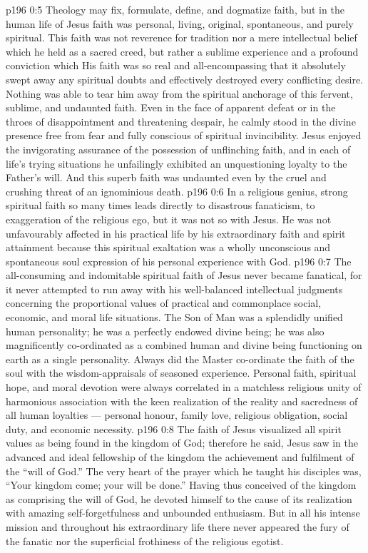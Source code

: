 \vs p196 0:5 Theology may fix, formulate, define, and dogmatize faith, but in the human life of Jesus faith was personal, living, original, spontaneous, and purely spiritual. This faith was not reverence for tradition nor a mere intellectual belief which he held as a sacred creed, but rather a sublime experience and a profound conviction which  His faith was so real and all\hyp{}encompassing that it absolutely swept away any spiritual doubts and effectively destroyed every conflicting desire. Nothing was able to tear him away from the spiritual anchorage of this fervent, sublime, and undaunted faith. Even in the face of apparent defeat or in the throes of disappointment and threatening despair, he calmly stood in the divine presence free from fear and fully conscious of spiritual invincibility. Jesus enjoyed the invigorating assurance of the possession of unflinching faith, and in each of life’s trying situations he unfailingly exhibited an unquestioning loyalty to the Father’s will. And this superb faith was undaunted even by the cruel and crushing threat of an ignominious death.
\vs p196 0:6 In a religious genius, strong spiritual faith so many times leads directly to disastrous fanaticism, to exaggeration of the religious ego, but it was not so with Jesus. He was not unfavourably affected in his practical life by his extraordinary faith and spirit attainment because this spiritual exaltation was a wholly unconscious and spontaneous soul expression of his personal experience with God.
\vs p196 0:7 The all\hyp{}consuming and indomitable spiritual faith of Jesus never became fanatical, for it never attempted to run away with his well\hyp{}balanced intellectual judgments concerning the proportional values of practical and commonplace social, economic, and moral life situations. The Son of Man was a splendidly unified human personality; he was a perfectly endowed divine being; he was also magnificently co\hyp{}ordinated as a combined human and divine being functioning on earth as a single personality. Always did the Master co\hyp{}ordinate the faith of the soul with the wisdom\hyp{}appraisals of seasoned experience. Personal faith, spiritual hope, and moral devotion were always correlated in a matchless religious unity of harmonious association with the keen realization of the reality and sacredness of all human loyalties --- personal honour, family love, religious obligation, social duty, and economic necessity.
\vs p196 0:8 The faith of Jesus visualized all spirit values as being found in the kingdom of God; therefore he said,  Jesus saw in the advanced and ideal fellowship of the kingdom the achievement and fulfilment of the “will of God.” The very heart of the prayer which he taught his disciples was, “Your kingdom come; your will be done.” Having thus conceived of the kingdom as comprising the will of God, he devoted himself to the cause of its realization with amazing self\hyp{}forgetfulness and unbounded enthusiasm. But in all his intense mission and throughout his extraordinary life there never appeared the fury of the fanatic nor the superficial frothiness of the religious egotist.
